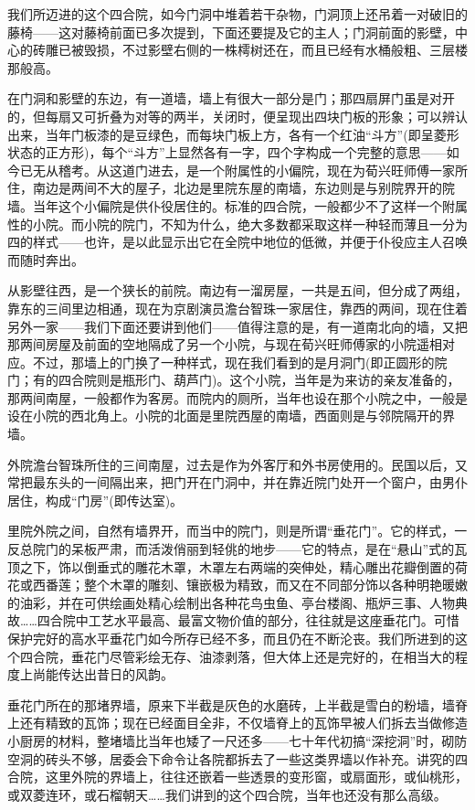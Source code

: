 \par 我们所迈进的这个四合院，如今门洞中堆着若干杂物，门洞顶上还吊着一对破旧的藤椅——这对藤椅前面已多次提到，下面还要提及它的主人；门洞前面的影壁，中心的砖雕已被毁损，不过影壁右侧的一株樗树还在，而且已经有水桶般粗、三层楼那般高。
\par 在门洞和影壁的东边，有一道墙，墙上有很大一部分是门；那四扇屏门虽是对开的，但每扇又可折叠为对等的两半，关闭时，便呈现出四块门板的形象；可以辨认出来，当年门板漆的是豆绿色，而每块门板上方，各有一个红油“斗方”(即呈菱形状态的正方形)，每个“斗方”上显然各有一字，四个字构成一个完整的意思——如今已无从稽考。从这道门进去，是一个附属性的小偏院，现在为荀兴旺师傅一家所住，南边是两间不大的屋子，北边是里院东屋的南墙，东边则是与别院界开的院墙。当年这个小偏院是供仆役居住的。标准的四合院，一般都少不了这样一个附属性的小院。而小院的院门，不知为什么，绝大多数都采取这样一种轻而薄且一分为四的样式——也许，是以此显示出它在全院中地位的低微，并便于仆役应主人召唤而随时奔出。
\par 从影壁往西，是一个狭长的前院。南边有一溜房屋，一共是五间，但分成了两组，靠东的三间里边相通，现在为京剧演员澹台智珠一家居住，靠西的两间，现在住着另外一家——我们下面还要讲到他们——值得注意的是，有一道南北向的墙，又把那两间房屋及前面的空地隔成了另一个小院，与现在荀兴旺师傅家的小院遥相对应。不过，那墙上的门换了一种样式，现在我们看到的是月洞门(即正圆形的院门；有的四合院则是瓶形门、葫芦门)。这个小院，当年是为来访的亲友准备的，那两间南屋，一般都作为客房。而院内的厕所，当年也设在那个小院之中，一般是设在小院的西北角上。小院的北面是里院西屋的南墙，西面则是与邻院隔开的界墙。
\par 外院澹台智珠所住的三间南屋，过去是作为外客厅和外书房使用的。民国以后，又常把最东头的一间隔出来，把门开在门洞中，并在靠近院门处开一个窗户，由男仆居住，构成“门房”(即传达室)。
\par 里院外院之间，自然有墙界开，而当中的院门，则是所谓“垂花门”。它的样式，一反总院门的呆板严肃，而活泼俏丽到轻佻的地步——它的特点，是在“悬山”式的瓦顶之下，饰以倒垂式的雕花木罩，木罩左右两端的突伸处，精心雕出花瓣倒置的荷花或西番莲；整个木罩的雕刻、镶嵌极为精致，而又在不同部分饰以各种明艳暖嫩的油彩，并在可供绘画处精心绘制出各种花鸟虫鱼、亭台楼阁、瓶炉三事、人物典故……四合院中工艺水平最高、最富文物价值的部分，往往就是这座垂花门。可惜保护完好的高水平垂花门如今所存已经不多，而且仍在不断沦丧。我们所进到的这个四合院，垂花门尽管彩绘无存、油漆剥落，但大体上还是完好的，在相当大的程度上尚能传达出昔日的风韵。
\par 垂花门所在的那堵界墙，原来下半截是灰色的水磨砖，上半截是雪白的粉墙，墙脊上还有精致的瓦饰；现在已经面目全非，不仅墙脊上的瓦饰早被人们拆去当做修造小厨房的材料，整堵墙比当年也矮了一尺还多——七十年代初搞“深挖洞”时，砌防空洞的砖头不够，居委会下命令让各院都拆去了一些这类界墙以作补充。讲究的四合院，这里外院的界墙上，往往还嵌着一些透景的变形窗，或扇面形，或仙桃形，或双菱连环，或石榴朝天……我们讲到的这个四合院，当年也还没有那么高级。

